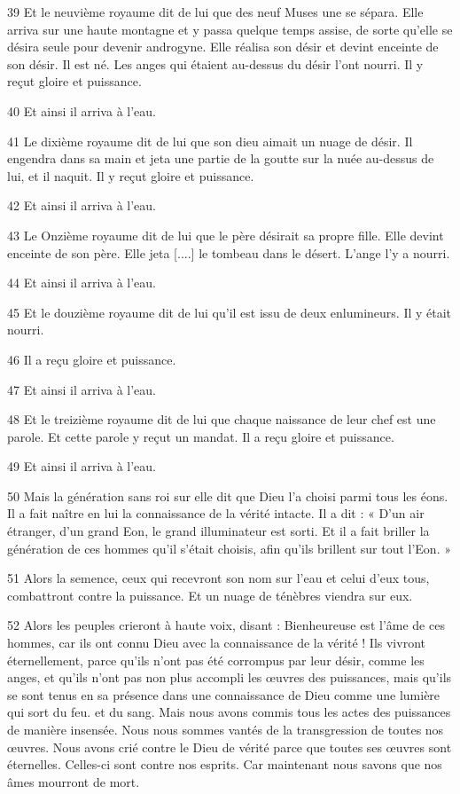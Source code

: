 \par 39 Et le neuvième royaume dit de lui que des neuf Muses une se sépara. Elle arriva sur une haute montagne et y passa quelque temps assise, de sorte qu'elle se désira seule pour devenir androgyne. Elle réalisa son désir et devint enceinte de son désir. Il est né. Les anges qui étaient au-dessus du désir l'ont nourri. Il y reçut gloire et puissance.
\par 40 Et ainsi il arriva à l'eau.
\par 41 Le dixième royaume dit de lui que son dieu aimait un nuage de désir. Il engendra dans sa main et jeta une partie de la goutte sur la nuée au-dessus de lui, et il naquit. Il y reçut gloire et puissance.
\par 42 Et ainsi il arriva à l'eau.
\par 43 Le Onzième royaume dit de lui que le père désirait sa propre fille. Elle devint enceinte de son père. Elle jeta [....] le tombeau dans le désert. L'ange l'y a nourri.
\par 44 Et ainsi il arriva à l'eau.

\par 45 Et le douzième royaume dit de lui qu'il est issu de deux enlumineurs. Il y était nourri.
\par 46 Il a reçu gloire et puissance.
\par 47 Et ainsi il arriva à l'eau.

\par 48 Et le treizième royaume dit de lui que chaque naissance de leur chef est une parole. Et cette parole y reçut un mandat. Il a reçu gloire et puissance.
\par 49 Et ainsi il arriva à l'eau.
\par 50 Mais la génération sans roi sur elle dit que Dieu l'a choisi parmi tous les éons. Il a fait naître en lui la connaissance de la vérité intacte. Il a dit : « D’un air étranger, d’un grand Eon, le grand illuminateur est sorti. Et il a fait briller la génération de ces hommes qu’il s’était choisis, afin qu’ils brillent sur tout l’Eon. »

\par 51 Alors la semence, ceux qui recevront son nom sur l'eau et celui d'eux tous, combattront contre la puissance. Et un nuage de ténèbres viendra sur eux.

\par 52 Alors les peuples crieront à haute voix, disant : Bienheureuse est l'âme de ces hommes, car ils ont connu Dieu avec la connaissance de la vérité ! Ils vivront éternellement, parce qu'ils n'ont pas été corrompus par leur désir, comme les anges, et qu'ils n'ont pas non plus accompli les œuvres des puissances, mais qu'ils se sont tenus en sa présence dans une connaissance de Dieu comme une lumière qui sort du feu. et du sang. Mais nous avons commis tous les actes des puissances de manière insensée. Nous nous sommes vantés de la transgression de toutes nos œuvres. Nous avons crié contre le Dieu de vérité parce que toutes ses œuvres sont éternelles. Celles-ci sont contre nos esprits. Car maintenant nous savons que nos âmes mourront de mort.

